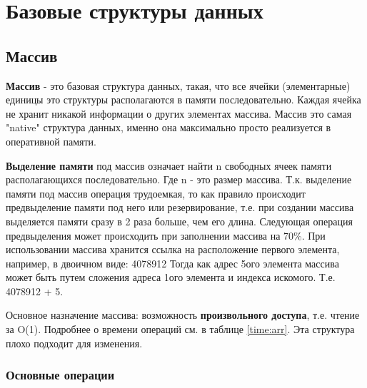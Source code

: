 \section{Базовые структуры данных}
\subsection{Массив}

\textbf{Массив} - это базовая структура данных, такая, что все ячейки (элементарные) единицы это структуры располагаются в памяти последовательно. Каждая ячейка не хранит никакой информации о других элементах массива. Массив это самая "native" структура данных, именно она максимально просто реализуется в оперативной памяти.

\textbf{Выделение памяти} под массив означает найти n свободных ячеек памяти располагающихся последовательно. Где n - это размер массива. Т.к. выделение памяти под массив операция трудоемкая, то как правило происходит предвыделение памяти под него или резервирование, т.е. при создании массива выделяется памяти сразу в 2 раза больше, чем его длина. Следующая операция предвыделения может происходить при заполнении массива на 70\%.
При использовании массива хранится ссылка на расположение первого элемента, например, в двоичном виде: 4078912
Тогда как адрес 5ого элемента массива может быть путем сложения адреса 1ого элемента и индекса искомого. Т.е. 4078912 + 5. 

Основное назначение массива: возможность \textbf{произвольного доступа}, т.е. чтение за O(1). Подробнее о времени операций см. в таблице \ref{time:arr}.
Эта структура плохо подходит для изменения.

\subsubsection{Основные операции}

